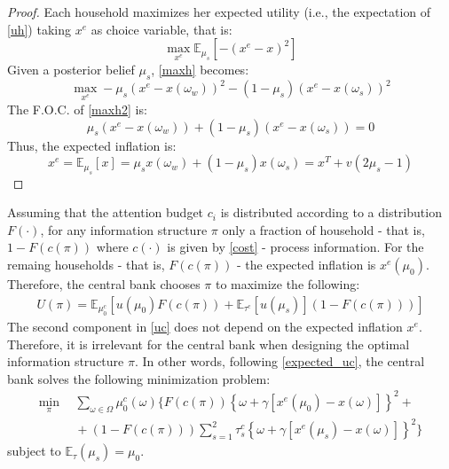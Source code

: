\documentclass[12pt,a4paper]{article}
\begin{document}
\begin{proof}
    Each household maximizes her expected utility (i.e., the expectation of \eqref{uh}) taking $x^e$ as choice variable, that is:
    \begin{equation}
    \label{maxh}
        \max_{x^e}  \mathbb{E}_{\mu_s}\left[-\left(x^e - x\right)^2\right]
    \end{equation}
    Given a posterior belief $\mu_s$, \eqref{maxh} becomes:
    \begin{equation}
    \label{maxh2}
        \max_{x^e}  -\mu_s\left(x^e - x(\omega_w)\right)^2-(1-\mu_s)\left(x^e - x(\omega_s)\right)^2
    \end{equation}
    The F.O.C. of \eqref{maxh2} is:
    \begin{equation*}
        \mu_s\left(x^e - x(\omega_w)\right)+(1-\mu_s)\left(x^e - x(\omega_s)\right)=0
    \end{equation*}
    Thus, the expected inflation is:
    \begin{equation*}
        x^e=\mathbb{E}_{\mu_s}[x]=\mu_sx(\omega_w)+(1-\mu_s)x(\omega_s)=x^T+v(2\mu_s-1)
    \end{equation*}
\end{proof}
Assuming that the attention budget $c_i$ is distributed according to a distribution $F(\cdot)$, for any information structure $\pi$ only a fraction of household - that is, $1-F(c(\pi))$ where $c(\cdot)$ is given by \eqref{cost} - process information. For the remaing households - that is, $F(c(\pi))$ - the expected inflation is $x^e(\mu_0)$. Therefore, the central bank chooses $\pi$ to maximize the following:
\begin{align}
    \label{expected_uc}
    U(\pi)=\mathbb{E}_{\mu_0^c}\left[u(\mu_0)F(c(\pi)) + \mathbb{E}_{\tau^c}[u(\mu_s)](1-F(c(\pi)))\right]
\end{align}
The second component in \eqref{uc} does not depend on the expected inflation $x^e$. Therefore, it is irrelevant for the central bank when designing the optimal information structure $\pi$. In other words, following \eqref{expected_uc}, the central bank solves the following minimization problem:
\begin{equation}
\label{minproblem}
    \begin{split}
    \min_{\pi} \ & \ \sum_{\omega\in\Omega}\mu_0^c(\omega)\Big\{F(c(\pi))\left\{\omega+\gamma\left[x^e(\mu_0)-x(\omega)\right]\right\}^2+\\
    \ & \ +(1-F(c(\pi)))\sum_{s=1}^{2}\tau_s^c\left\{\omega+\gamma\left[x^e(\mu_s)-x(\omega)\right]\right\}^2\Big\}
    \end{split}
\end{equation}
subject to $\mathbb{E}_{\tau}(\mu_s)=\mu_0$. 
\end{document}
